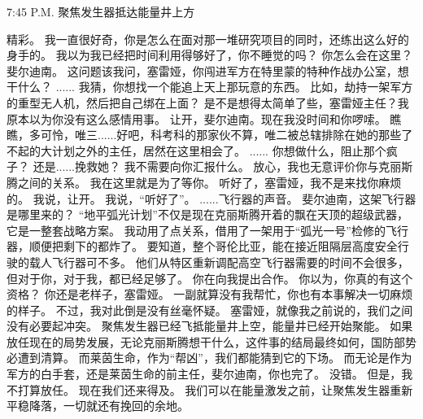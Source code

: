 \documentclass[openany]{book}
\begin{document}
7:45 P.M. 聚焦发生器抵达能量井上方
\begin{dialogue}
     精彩。
     我一直很好奇，你是怎么在面对那一堆研究项目的同时，还练出这么好的身手的。
     我以为我已经把时间利用得够好了，你不睡觉的吗？
     你怎么会在这里？
     斐尔迪南。
     这问题该我问，塞雷娅，你闯进军方在特里蒙的特种作战办公室，想干什么？
     ......
     我猜，你想找一个能追上天上那玩意的东西。
     比如，劫持一架军方的重型无人机，然后把自己绑在上面？
     是不是想得太简单了些，塞雷娅主任？我原本以为你没有这么感情用事。
     让开，斐尔迪南。现在我没时间和你啰嗦。
     瞧瞧，多可怜，唯三......好吧，科考科的那家伙不算，唯二被总辖排除在她的那些了不起的大计划之外的主任，居然在这里相会了。
     ......
     你想做什么，阻止那个疯子？
     还是......挽救她？
     我不需要向你汇报什么。
     放心，我也无意评价你与克丽斯腾之间的关系。
     我在这里就是为了等你。
     听好了，塞雷娅，我不是来找你麻烦的。
     我说，让开。
     我说，“听好了”。
     ......飞行器的声音。
     斐尔迪南，这架飞行器是哪里来的？
     “地平弧光计划”不仅是现在克丽斯腾开着的飘在天顶的超级武器，它是一整套战略方案。
     我动用了点关系，借用了一架用于“弧光一号”检修的飞行器，顺便把剩下的都炸了。
     要知道，整个哥伦比亚，能在接近阻隔层高度安全行驶的载人飞行器可不多。
     他们从特区重新调配高空飞行器需要的时间不会很多，但对于你，对于我，都已经足够了。
     你在向我提出合作。
     你以为，你真的有这个资格？
     你还是老样子，塞雷娅。
     一副就算没有我帮忙，你也有本事解决一切麻烦的样子。
     不过，我对此倒是没有丝毫怀疑。
     塞雷娅，就像我之前说的，我们之间没有必要起冲突。
     聚焦发生器已经飞抵能量井上空，能量井已经开始聚能。
     如果放任现在的局势发展，无论克丽斯腾想干什么，这件事的结局最终如何，国防部势必遭到清算。
     而莱茵生命，作为“帮凶”，我们都能猜到它的下场。
     而无论是作为军方的白手套，还是莱茵生命的前主任，斐尔迪南，你也完了。
     没错。
     但是，我不打算放任。
     现在我们还来得及。
     我们可以在能量激发之前，让聚焦发生器重新平稳降落，一切就还有挽回的余地。

\end{dialogue}
\end{document}
